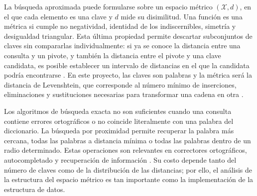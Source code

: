 \documentclass[11pt]{article}
\begin{document}
La búsqueda aproximada puede formularse sobre un espacio métrico $(\mathcal{X},d)$,
en el que cada elemento es una clave y $d$ mide su disimilitud. Una función es
una métrica si cumple no negatividad, identidad de los indiscernibles,
simetría y desigualdad triangular. Esta última propiedad permite descartar
subconjuntos de claves sin compararlas individualmente: si ya se conoce la
distancia entre una consulta y un pivote, y también la distancia entre el
pivote y una clave candidata, es posible establecer un intervalo de
distancias en el que la candidata podría encontrarse
\cite{chavez2001searching}. En este proyecto, las claves son palabras y la
métrica será la distancia de Levenshtein, que corresponde al número mínimo de
inserciones, eliminaciones y sustituciones necesarias para transformar una
cadena en otra \cite{levenshtein1966binary}.

Los algoritmos de búsqueda exacta no son suficientes cuando una consulta
contiene errores ortográficos o no coincide literalmente con una palabra del
diccionario. La búsqueda por proximidad permite recuperar la palabra más
cercana, todas las palabras a distancia mínima o todas las palabras dentro de
un radio determinado. Estas operaciones son relevantes en correctores
ortográficos, autocompletado y recuperación de información
\cite{navarro2001guided}. Su costo depende tanto del número de claves como de
la distribución de las distancias; por ello, el análisis de la estructura del
espacio métrico es tan importante como la implementación de la estructura de
datos.
\end{document}
